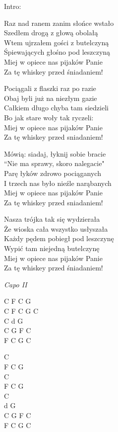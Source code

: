 \begin{text}
Intro:\\
    \hfill\break
    \hfill\break
    \hfill\break
    \hfill\break
    \hfill\break

Raz nad ranem zanim słońce wstało\\
Szedłem drogą z głową obolałą\\
Wtem ujrzałem gości z butelczyną\\
Śpiewających głośno pod leszczyną\\
\vin Miej w opiece nas pijaków Panie\\
\vin Za tę whiskey przed śniadaniem!
    \hfill\break
    \hfill\break

Pociągali z flaszki raz po razie\\
Obaj byli już na niezłym gazie\\
Całkiem długo chyba tam siedzieli\\
Bo jak stare woły tak ryczeli:\\
\vin Miej w opiece nas pijaków Panie\\
\vin Za tę whiskey przed sniadaniem!

Mówią: siadaj, łyknij sobie bracie\\
“Nie ma sprawy, skoro nalegacie"\\
Parę łyków zdrowo pociąganych\\
I trzech nas było nieźle narąbanych\\
\vin Miej w opiece nas pijaków Panie\\
\vin Za tę whiskey przed sniadaniem!

Nasza trójka tak się wydzierała\\
Że wioska cała wszystko usłyszała\\
Każdy pędem pobiegł pod leszczynę\\
Wypić tam niejedną butelczynę\\
\vin Miej w opiece nas pijaków Panie\\
\vin Za tę whiskey przed śniadaniem!

\end{text}
\begin{chord}
\textit{Capo II}

C F C G\\
C F C G C\\
C d G\\
C G F C\\
F C G C

C\\
F C G\\
C\\
F C G\\
C\\
d G\\
C G F C\\
F C G C\\

\end{chord}